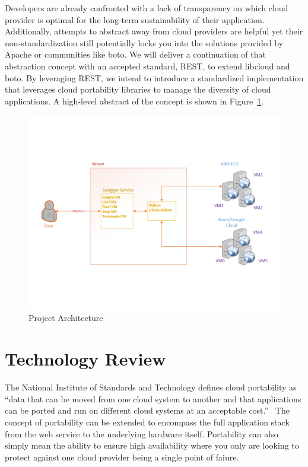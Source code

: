 Developers are already confronted with a lack of transparency on which cloud
provider is optimal for the long-term sustainability of their application.
Additionally, attempts to abstract away from cloud providers are helpful yet
their non-standardization still potentially locks you into the solutions
provided by Apache or communities like boto. We will deliver a continuation of
that abstraction concept with an accepted standard, REST, to extend libcloud and
boto. By leveraging REST, we intend to introduce a standardized implementation
that leverages cloud portability libraries to manage the diversity of cloud
applications. A high-level abstract of the concept is shown in
Figure~\ref{F:arch}.

\begin{figure}[!ht]
  \centering
  \includegraphics[width=\columnwidth]{images/proj-arch.pdf}
  \caption{Project Architecture}\label{F:arch}
\end{figure}

\section{Technology Review}

The National Institute of Standards and Technology defines cloud  portability as
``data that can be moved from one cloud system to another and that  applications
can be ported and run on different  cloud systems at an  acceptable
cost.''~\cite{hid-sp18-518-NIST-291} The concept of portability can be extended
to encompass the full application stack from the web service to the underlying
hardware itself. Portability can also simply mean the ability to ensure high
availability where you only are looking to protect against one cloud provider
being a single point of faiure.

